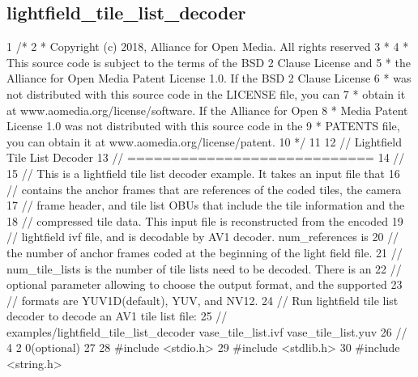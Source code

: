  \hypertarget{example_lightfield_tile_list_decoder}{}\subsection{lightfield\+\_\+tile\+\_\+list\+\_\+decoder}\label{example_lightfield_tile_list_decoder}

\begin{DoxyCodeInclude}
1 \textcolor{comment}{/*}
2 \textcolor{comment}{ * Copyright (c) 2018, Alliance for Open Media. All rights reserved}
3 \textcolor{comment}{ *}
4 \textcolor{comment}{ * This source code is subject to the terms of the BSD 2 Clause License and}
5 \textcolor{comment}{ * the Alliance for Open Media Patent License 1.0. If the BSD 2 Clause License}
6 \textcolor{comment}{ * was not distributed with this source code in the LICENSE file, you can}
7 \textcolor{comment}{ * obtain it at www.aomedia.org/license/software. If the Alliance for Open}
8 \textcolor{comment}{ * Media Patent License 1.0 was not distributed with this source code in the}
9 \textcolor{comment}{ * PATENTS file, you can obtain it at www.aomedia.org/license/patent.}
10 \textcolor{comment}{ */}
11 
12 \textcolor{comment}{// Lightfield Tile List Decoder}
13 \textcolor{comment}{// ============================}
14 \textcolor{comment}{//}
15 \textcolor{comment}{// This is a lightfield tile list decoder example. It takes an input file that}
16 \textcolor{comment}{// contains the anchor frames that are references of the coded tiles, the camera}
17 \textcolor{comment}{// frame header, and tile list OBUs that include the tile information and the}
18 \textcolor{comment}{// compressed tile data. This input file is reconstructed from the encoded}
19 \textcolor{comment}{// lightfield ivf file, and is decodable by AV1 decoder. num\_references is}
20 \textcolor{comment}{// the number of anchor frames coded at the beginning of the light field file.}
21 \textcolor{comment}{// num\_tile\_lists is the number of tile lists need to be decoded. There is an}
22 \textcolor{comment}{// optional parameter allowing to choose the output format, and the supported}
23 \textcolor{comment}{// formats are YUV1D(default), YUV, and NV12.}
24 \textcolor{comment}{// Run lightfield tile list decoder to decode an AV1 tile list file:}
25 \textcolor{comment}{// examples/lightfield\_tile\_list\_decoder vase\_tile\_list.ivf vase\_tile\_list.yuv}
26 \textcolor{comment}{// 4 2 0(optional)}
27 
28 \textcolor{preprocessor}{#include <stdio.h>}
29 \textcolor{preprocessor}{#include <stdlib.h>}
30 \textcolor{preprocessor}{#include <string.h>}

\end{DoxyCodeInclude}
